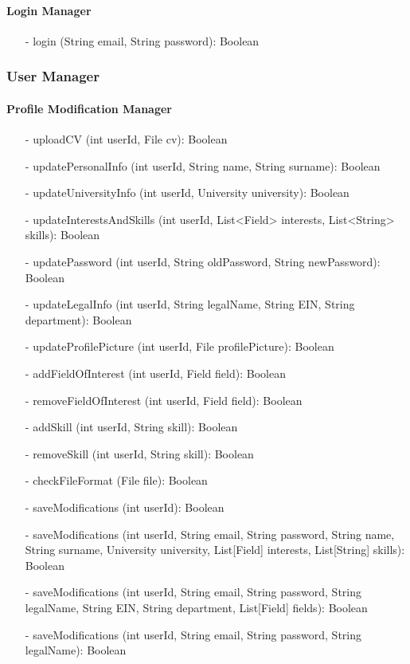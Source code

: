 \paragraph{Login Manager}
\begin{itemize}
    \item[-] login (String email, String password): Boolean
\end{itemize}


\subsubsection{User Manager}
\paragraph{Profile Modification Manager}
\begin{itemize}
    \item[-] uploadCV (int userId, File cv): Boolean
    \item[-] updatePersonalInfo (int userId, String name, String surname): Boolean
    \item[-] updateUniversityInfo (int userId, University university): Boolean
    \item[-] updateInterestsAndSkills (int userId, List<Field> interests, List<String> skills): Boolean
    \item[-] updatePassword (int userId, String oldPassword, String newPassword): Boolean
    \item[-] updateLegalInfo (int userId, String legalName, String EIN, String department): Boolean
    \item[-] updateProfilePicture (int userId, File profilePicture): Boolean
    \item[-] addFieldOfInterest (int userId, Field field): Boolean
    \item[-] removeFieldOfInterest (int userId, Field field): Boolean
    \item[-] addSkill (int userId, String skill): Boolean
    \item[-] removeSkill (int userId, String skill): Boolean
    \item[-] checkFileFormat (File file): Boolean
    \item[-] saveModifications (int userId): Boolean 
    \item[-] saveModifications (int userId, String email, String password, String name, String surname, University university, List[Field] interests, List[String] skills): Boolean
    \item[-] saveModifications (int userId, String email, String password, String legalName, String EIN, String department, List[Field] fields): Boolean
    \item[-] saveModifications (int userId, String email, String password, String legalName): Boolean  
\end{itemize}

